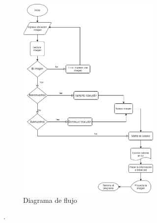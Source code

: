 \documentclass{article}
\begin{document}
\begin{figure}[h]
\includegraphics[width=7cm]{Diagramaparcial.png}
\centering
\caption{Diagrama de flujo}
\label{fig:Diagramaparcial.png}
\end{figure}


\cite{Digitalizacionwebsite}.\\\\

\end{document}

